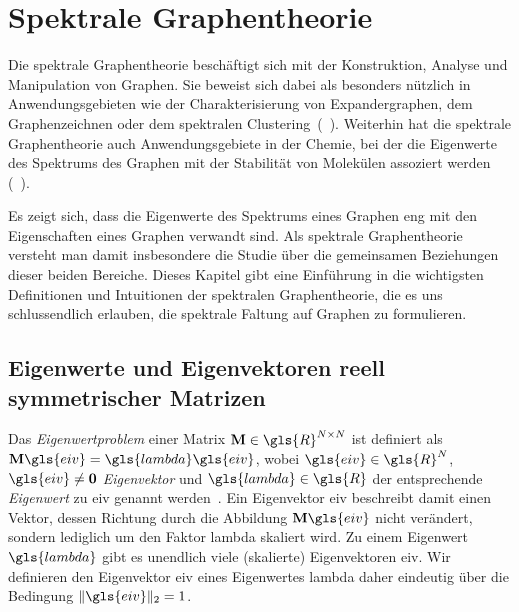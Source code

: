 \section{Spektrale Graphentheorie}
\label{spektrale_graphentheorie}

Die spektrale Graphentheorie beschäftigt sich mit der Konstruktion, Analyse und Manipulation von Graphen.
Sie beweist sich dabei als besonders nützlich in Anwendungsgebieten wie der Charakterisierung von Expandergraphen, dem Graphenzeichnen oder dem spektralen Clustering~(\vgl{}~\cite{Shuman}).
Weiterhin hat die spektrale Graphentheorie \zB{} auch Anwendungsgebiete in der Chemie, bei der die Eigenwerte des Spektrums des Graphen mit der Stabilität von Molekülen assoziert werden (\vgl{}~\cite{Chung}).

Es zeigt sich, dass die Eigenwerte des Spektrums eines Graphen eng mit den Eigenschaften eines Graphen verwandt sind.
Als spektrale Graphentheorie versteht man damit insbesondere die Studie über die gemeinsamen Beziehungen dieser beiden Bereiche.
Dieses Kapitel gibt eine Einführung in die wichtigsten Definitionen und Intuitionen der spektralen Graphentheorie, die es uns schlussendlich erlauben, die spektrale Faltung auf Graphen zu formulieren.

\subsection{Eigenwerte und Eigenvektoren reell symmetrischer Matrizen}
\label{eigenwerte_symmetrischer_matrizen}

Das \emph{Eigenwertproblem} einer Matrix $\ma{M} \in \gls{R}^{N \times N}$ ist definiert als $\ma{M}\gls{eiv} = \gls{lambda}\gls{eiv}$, wobei $\gls{eiv} \in \gls{R}^{N}$, $\gls{eiv} \neq \mathbf{0}$ \emph{Eigenvektor} und $\gls{lambda} \in \gls{R}$ der entsprechende \emph{Eigenwert} zu \gls{eiv} genannt werden~\cite{linear}.
Ein Eigenvektor \gls{eiv} beschreibt damit einen Vektor, dessen Richtung durch die Abbildung $\ma{M}\gls{eiv}$ nicht verändert, sondern lediglich um den Faktor \gls{lambda} skaliert wird.
Zu einem Eigenwert $\gls{lambda}$ gibt es unendlich viele (skalierte) Eigenvektoren \gls{eiv}.
Wir definieren den Eigenvektor \gls{eiv} eines Eigenwertes \gls{lambda} daher eindeutig über die Bedingung $\left\|\gls{eiv}\right\|_2 = 1$.

